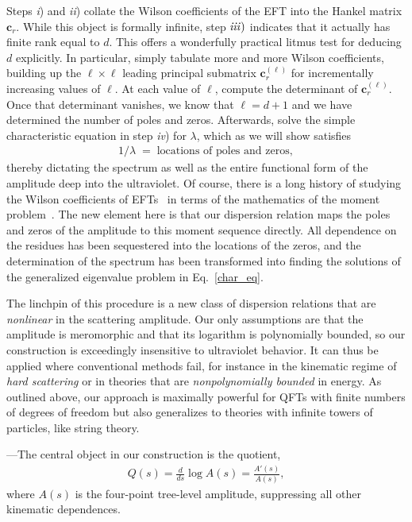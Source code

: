 \documentclass[twocolumn,english,aps,prd,reprint,floatfix,notitlepage,footinbib,preprintnumbers,superscriptaddress,longbibliography]{revtex4-1}
\newcommand{\be}{\begin{equation}}
\newcommand{\ee}{\end{equation}}
\newcommand{\eq}[2]{\be\begin{aligned}#1 \label{#2}\end{aligned}\ee}
\newcommand{\mysec}[1]{\noindent {\bf #1.}---}
\begin{document}
 Steps {\it i}) and {\it ii}) collate the Wilson coefficients of the EFT into the Hankel matrix  $\mathbf{c}_r$.  While this object is formally infinite, step ${\it iii})$ indicates that it actually has finite rank equal to $d$.  This offers a wonderfully practical litmus test for deducing $d$ explicitly.  In particular,
simply tabulate more and more Wilson coefficients, building up the $\ell\times \ell$ leading principal submatrix $\mathbf{c}_r^{(\ell)}$ for incrementally increasing values of $\ell$.  At each value of $\ell$, compute the determinant of $\mathbf{c}_r^{(\ell)}$.  Once that determinant vanishes, we know that $\ell=d+1$ and we have determined the number of poles and zeros.
Afterwards, solve the simple characteristic equation in step {\it iv}) for $\lambda$, which as we will show satisfies
\eq{
1/\lambda \;=\; \textrm{locations of poles and zeros},
}{}
thereby dictating the spectrum as well as the entire functional form of the amplitude deep into the ultraviolet.
Of course, there is a long history of studying the Wilson coefficients of EFTs~\cite{Wan:2024eto,Arkani-Hamed:2020blm,Bellazzini:2020cot} in terms of the mathematics of the moment problem~\cite{schmudgen2017moment}.  The new element here is that our dispersion relation maps the poles and zeros of the amplitude to this moment sequence directly. All dependence on the residues has been sequestered into the locations of the zeros, and the determination of the spectrum has been transformed into finding the solutions of the generalized eigenvalue problem in Eq.~\eqref{char_eq}.

The linchpin of this procedure is a new class of dispersion relations that are {\it nonlinear} in the scattering amplitude.  Our only assumptions are that the amplitude is meromorphic and that its logarithm is polynomially bounded, so our construction is exceedingly insensitive to ultraviolet behavior.   It can thus be applied  where conventional methods fail, for instance in the kinematic regime of {\it hard scattering} or in theories that are {\it nonpolynomially bounded} in energy.
As outlined above, our approach is maximally powerful for QFTs with finite numbers of degrees of freedom but also generalizes to
 theories with infinite towers of particles, like string theory.






\medskip
\mysec{Dispersion Relation}The central object in our construction is the quotient,
\eq{
Q(s) = \frac{d}{d  s} \log A(s)  =  \frac{A'(s) }{A(s)},
}{}
where $A(s)$ is the four-point tree-level amplitude, suppressing all other kinematic dependences.
\end{document}
